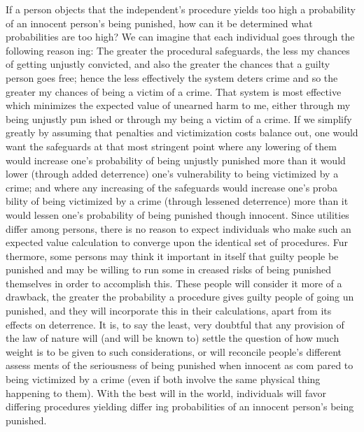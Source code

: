 \documentclass[11pt,openany]{book}
\begin{document}
If a person objects that the independent's procedure yields too high a probability of an innocent person's being punished, how can it be determined what probabilities are too high? We can imagine that each individual goes through the following reason ing: The greater the procedural safeguards, the less my chances of getting unjustly convicted, and also the greater the chances that a guilty person goes free; hence the less effectively the system deters crime and so the greater my chances of being a victim of a crime. That system is most effective which minimizes the expected value of unearned harm to me, either through my being unjustly pun ished or through my being a victim of a crime. If we simplify greatly by assuming that penalties and victimization costs balance out, one would want the safeguards at that most stringent point where any lowering of them would increase one's probability of being unjustly punished more than it would lower (through added deterrence) one's vulnerability to being victimized by a crime; and where any increasing of the safeguards would increase one's proba bility of being victimized by a crime (through lessened deterrence) more than it would lessen one's probability of being punished though innocent. Since utilities differ among persons, there is no reason to expect individuals who make such an expected value calculation to converge upon the identical set of procedures. Fur thermore, some persons may think it important in itself that guilty people be punished and may be willing to run some in creased risks of being punished themselves in order to accomplish this. These people will consider it more of a drawback, the greater the probability a procedure gives guilty people of going un punished, and they will incorporate this in their calculations, apart from its effects on deterrence. It is, to say the least, very doubtful that any provision of the law of nature will (and will be known to) settle the question of how much weight is to be given to such considerations, or will reconcile people's different assess ments of the seriousness of being punished when innocent as com pared to being victimized by a crime (even if both involve the same physical thing happening to them). With the best will in the world, individuals will favor differing procedures yielding differ ing probabilities of an innocent person's being punished. 
\end{document}
